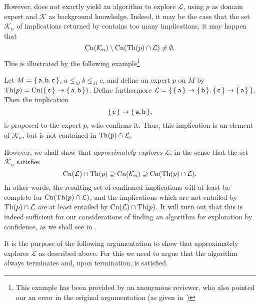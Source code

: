 However,  does not exactly yield an algorithm to explore
$\mathcal{L}$, using $p$ as domain expert and $\mathcal{K}$ as background knowledge.
Indeed, it may be the case that the set $\mathcal{K}_{n}$ of implications returned by
 contains too many implications, \ie it may happen that
\begin{equation*}
  \operatorname{Cn}(\mathcal{K}_{n}) \setminus \operatorname{Cn}(\operatorname{Th}(p) \cap \mathcal{L}) \neq \emptyset.
\end{equation*}
This is illustrated by the following example\footnote{This example has been provided by an
  anonymous reviewer, who also pointed our an error in the original argumentation (as
  given in~\cite{Borch-LTCS-13-04})}

\begin{Example}
  \label{expl:exploring-sets-of-implications-may-be-approximative}
  Let $M = {\{\, \mathsf{a}, \mathsf{b}, \mathsf{c} \,\}}$, $a \leq_{M} b \leq_{M} c$, and
  define an expert $p$ on $M$ by $\operatorname{Th}(p) = \operatorname{Cn}({\{\, \mathsf{c} \,\}} \to {\ensuremath{\{\, \mathsf{a},
    \mathsf{b} \,\}}})$.  Define furthermore $\mathcal{L} = {\{\, {\{\, \mathsf{a} \,\}} \to {\ensuremath{\{\,
      \mathsf{b} \,\}}}, {\{\, \mathsf{c} \,\}} \to {\ensuremath{\{\, \mathsf{a} \,\}}} \,\}}$.  Then the implication
  \begin{equation*}
    {\ensuremath{\{\, \mathsf{c} \,\}}} \to {\ensuremath{\{\, \mathsf{a}, \mathsf{b} \,\}}},
  \end{equation*}
  is proposed to the expert $p$, who confirms it.  Thus, this implication is an element of
  $\mathcal{K}_{n}$, but is not contained in $\operatorname{Th}(p) \cap \mathcal{L}$.
\end{Example}

However, we shall show that  \emph{approximately explores}
$\mathcal{L}$, in the sense that the set $\mathcal{K}_{n}$ satisfies
\begin{equation}
  \label{eq:61}
  \operatorname{Cn}(\mathcal{L}) \cap \operatorname{Th}(p) \supseteq \operatorname{Cn}(\mathcal{K}_{n}) \supseteq \operatorname{Cn}(\operatorname{Th}(p) \cap \mathcal{L}).
\end{equation}
In other words, the resulting set of confirmed implications will at least be complete for
$\operatorname{Cn}(\operatorname{Th}(p) \cap \mathcal{L})$, and the implications which are not entailed by $\operatorname{Th}(p)
\cap \mathcal{L}$ are at least entailed by $\operatorname{Cn}(\mathcal{L}) \cap \operatorname{Th}(p)$.  It will turn
out that this is indeed sufficient for our considerations of finding an algorithm for
exploration by confidence, as we shall see in .

It is the purpose of the following argumentation to show that
 approximately explores $\mathcal{L}$ as described above.
For this we need to argue that the algorithm always terminates and, upon termination,
 is satisfied.

